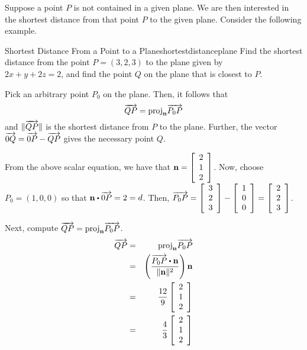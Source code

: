 Suppose a point $P$ is not contained in a given plane. We are then interested in the shortest distance from that point $P$ to the given plane. Consider the following example. 

\begin{example}{Shortest Distance From a Point to a Plane}{shortestdistanceplane}
Find the shortest distance from the point $P = (3,2,3)$ to the plane given by \\ $ 2x + y + 2z = 2$, and find the point $Q$ on the plane that is closest to $P$. 
\end{example}

\begin{solution}
Pick an arbitrary point $P_0$ on the plane. Then, it follows that
\[
\overrightarrow{QP} = \mbox{proj}_{{\bf n}}\overrightarrow{P_0P}
\]
and $\| \overrightarrow{QP} \|$ is the shortest distance from $P$ to the plane. Further, the vector $\overrightarrow{0Q} = \overrightarrow{0P} - \overrightarrow{QP}$ gives the necessary point $Q$. 

From the above scalar equation, we have that ${\bf n} = 
\left[
\begin{array}{c}
2 \\
1 \\
2 
\end{array}
\right]$. Now, choose $P_0 = (1, 0, 0)$ so that $\vect{n} \dotprod \longvect{0P} = 2 = d$. 
Then, $\overrightarrow{P_0P} = \left[
\begin{array}{c}
3 \\
2 \\
3
\end{array}
\right]
- 
\left[
\begin{array}{c}
1 \\
0 \\
0
\end{array}
\right]
=
\left[
\begin{array}{c}
2 \\
2 \\
3
\end{array}
\right]$. 

Next, compute $\overrightarrow{QP} = \mbox{proj}_{{\bf n}}\overrightarrow{P_0P}$. 
\begin{eqnarray*}
\longvect{QP} &=& \func{proj}_{\vect{n}}\longvect{P_0P} \\
&=& \left( \frac{ \longvect{P_0P} \dotprod \vect{n}}{\vectlength \vect{n} \vectlength ^2}\right)\vect{n} \\
&=& \frac{12}{9} \leftB
\begin{array}{r}
2 \\
1 \\
2
\end{array}
\rightB \\
&=& \frac{4}{3} \leftB
\begin{array}{r}
2 \\
1 \\
2
\end{array}
\rightB 
\end{eqnarray*}


\end{solution}
